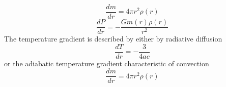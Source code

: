 \begin{equation}
    \frac{dm}{dr} = 4\pi r^2 \rho(r)
\end{equation}
\begin{equation}
    \frac{dP}{dr} = -\frac{G m(r)\rho(r)}{r^2}
\end{equation}
The temperature gradient is described by either by radiative diffusion
\begin{equation}
    \frac{dT}{dr} = -\frac{3}{4ac}
\end{equation}
or the adiabatic temperature gradient characteristic of convection
\begin{equation}
    \frac{dm}{dr} = 4\pi r^2 \rho(r)
\end{equation}